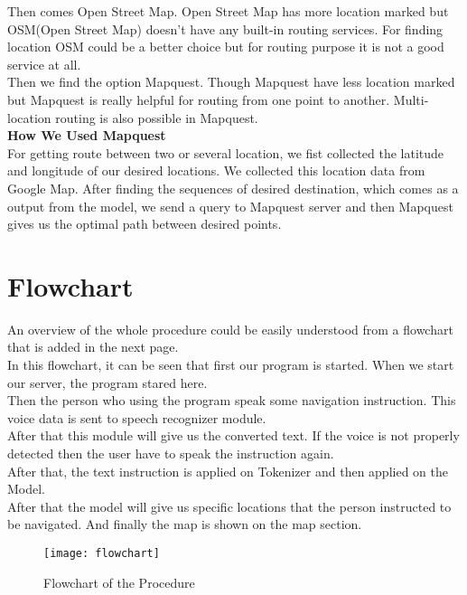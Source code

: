 Then comes Open Street Map. Open Street Map has more location marked but OSM(Open Street Map) doesn't have any built-in routing services. For finding location OSM could be a better choice but for routing purpose it is not a good service at all. \\

Then we find the option Mapquest. Though Mapquest have less location marked but Mapquest is really helpful for routing from one point to another. Multi-location routing is also possible in Mapquest. \\

\textbf{How We Used Mapquest} \\
For getting route between two or several location, we fist collected the latitude and longitude of our desired locations. We collected this location data from Google Map. After finding the sequences of desired destination, which comes as a output from the model, we send a query to Mapquest server and then Mapquest gives us the optimal path between desired points. \\

\section{Flowchart}
An overview of the whole procedure could be easily understood from a flowchart that is added in the next page. \\

In this flowchart, it can be seen that first our program is started. When we start our server, the program stared here. \\

Then the person who using the program speak some navigation instruction. This voice data is sent to speech recognizer module. \\

After that this module will give us the converted text. If the voice is not properly detected then the user have to speak the instruction again. \\

After that, the text instruction is applied on Tokenizer and then applied on the Model. \\

After that the model will give us specific locations that the person instructed to be navigated. And finally the map is shown on the map section. \\

\begin{figure}[h]
    \centering
    \texttt{[image: flowchart]}
    \caption{Flowchart of the Procedure}
\end{figure}
\vline